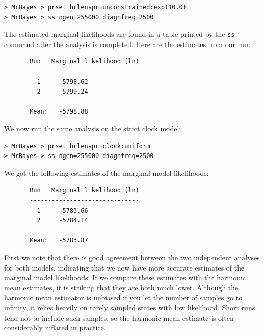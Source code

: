 \documentclass[12pt]{book}
\newcommand{\ttt}[1]{\texttt{#1}}
\begin{document}
\begin{singlespacing}
\small
\begin{verbatim}
> MrBayes > prset brlenspr=unconstrained:exp(10.0)
> MrBayes > ss ngen=255000 diagnfreq=2500
\end{verbatim}
\end{singlespacing}
\normalsize

The estimated marginal likelihoods are found in a table printed by the \ttt{ss} command after the
analysis is completed. Here are the estimates from our run:

\begin{singlespacing}
\footnotesize
\begin{verbatim}
       Run   Marginal likelihood (ln)
       ------------------------------
         1     -5798.62   
         2     -5799.24   
       ------------------------------
       Mean:   -5798.88
\end{verbatim}
\end{singlespacing}
\normalsize

We now run the same analysis on the strict clock model:

\begin{singlespacing}
\small
\begin{verbatim}
> MrBayes > prset brlenspr=clock:uniform
> MrBayes > ss ngen=255000 diagnfreq=2500
\end{verbatim}
\end{singlespacing}
\normalsize

We got the following estimates of the marginal model likelihoods:

\begin{singlespacing}
\footnotesize
\begin{verbatim}
       Run   Marginal likelihood (ln)
       ------------------------------
         1     -5783.66   
         2     -5784.14   
       ------------------------------
       Mean:   -5783.87
\end{verbatim}
\end{singlespacing}
\normalsize

First we note that there is good agreement between the two independent analyses for both models,
indicating that we now have more accurate estimates of the marginal model likelihoods. If we
compare these estimates with the harmonic mean estimates, it is striking that they are both much
lower.  Although the harmonic mean estimator is unbiased if you let the number of samples go to
infinity, it relies heavily on rarely sampled states with low likelihood. Short runs tend not to
include such samples, so the harmonic mean estimate is often considerably inflated in practice.
\end{document}
